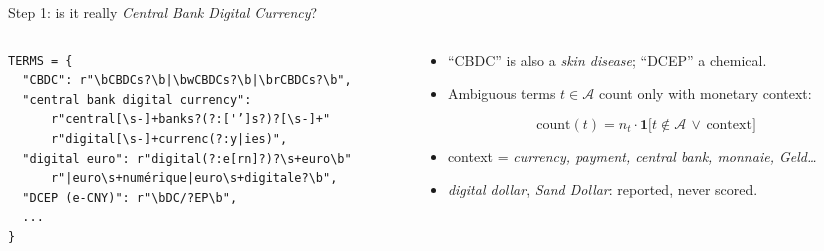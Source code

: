 \documentclass[aspectratio=169,10pt]{beamer}
\begin{document}
\begin{frame}[fragile]{Step 1: is it really \emph{Central Bank Digital Currency}?}
\begin{columns}[T]
\begin{column}{0.5\textwidth}
\begin{lstlisting}
TERMS = {
  "CBDC": r"\bCBDCs?\b|\bwCBDCs?\b|\brCBDCs?\b",
  "central bank digital currency":
      r"central[\s-]+banks?(?:['’]s?)?[\s-]+"
      r"digital[\s-]+currenc(?:y|ies)",
  "digital euro": r"digital(?:e[rn]?)?\s+euro\b"
      r"|euro\s+numérique|euro\s+digitale?\b",
  "DCEP (e-CNY)": r"\bDC/?EP\b",
  ...
}
\end{lstlisting}
\end{column}
\begin{column}{0.47\textwidth}\small
\begin{itemize}
\item ``CBDC'' is also a \emph{skin disease}; ``DCEP'' a chemical.
\item Ambiguous terms $t\in\mathcal{A}$ count only with \alert{monetary context}:
\end{itemize}
\[
\text{count}(t) = n_t \cdot \mathbf{1}\big[t \notin \mathcal{A} \,\lor\, \text{context}\big]
\]
\begin{itemize}
\item context = \emph{currency, payment, central bank, monnaie, Geld\dots}
\item \emph{digital dollar}, \emph{Sand Dollar}: reported, never scored.
\end{itemize}
\end{column}
\end{columns}
\end{frame}
\end{document}
